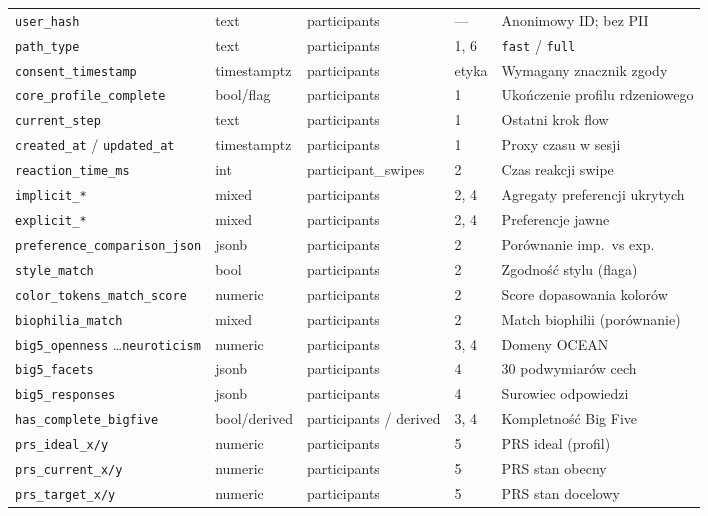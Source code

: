 \begin{longtable}{@{}p{3.6cm}p{1.8cm}p{2.4cm}p{1.4cm}p{3.2cm}@{}}
  \texttt{user\_hash} & text & participants & --- & Anonimowy ID; bez PII \\
  \texttt{path\_type} & text & participants & 1, 6 & \texttt{fast} / \texttt{full} \\
  \texttt{consent\_timestamp} & timestamptz & participants & etyka & Wymagany znacznik zgody \\
  \texttt{core\_profile\_complete} & bool/flag & participants & 1 & Ukończenie profilu rdzeniowego \\
  \texttt{current\_step} & text & participants & 1 & Ostatni krok flow \\
  \texttt{created\_at} / \texttt{updated\_at} & timestamptz & participants & 1 & Proxy czasu w sesji \\
  \addlinespace
  \texttt{reaction\_time\_ms} & int & participant\_swipes & 2 & Czas reakcji swipe \\
  \texttt{implicit\_*} & mixed & participants & 2, 4 & Agregaty preferencji ukrytych \\
  \texttt{explicit\_*} & mixed & participants & 2, 4 & Preferencje jawne \\
  \texttt{preference\_comparison\_json} & jsonb & participants & 2 & Porównanie imp.\ vs exp. \\
  \texttt{style\_match} & bool & participants & 2 & Zgodność stylu (flaga) \\
  \texttt{color\_tokens\_match\_score} & numeric & participants & 2 & Score dopasowania kolorów \\
  \texttt{biophilia\_match} & mixed & participants & 2 & Match biophilii (porównanie) \\
  \addlinespace
  \texttt{big5\_openness} \ldots \texttt{neuroticism} & numeric & participants & 3, 4 & Domeny OCEAN \\
  \texttt{big5\_facets} & jsonb & participants & 4 & 30 podwymiarów cech \\
  \texttt{big5\_responses} & jsonb & participants & 4 & Surowiec odpowiedzi \\
  \texttt{has\_complete\_bigfive} & bool/derived & participants / derived & 3, 4 & Kompletność Big Five \\
  \addlinespace
  \texttt{prs\_ideal\_x/y} & numeric & participants & 5 & PRS ideal (profil) \\
  \texttt{prs\_current\_x/y} & numeric & participants & 5 & PRS stan obecny \\
  \texttt{prs\_target\_x/y} & numeric & participants & 5 & PRS stan docelowy \\

\end{longtable}
